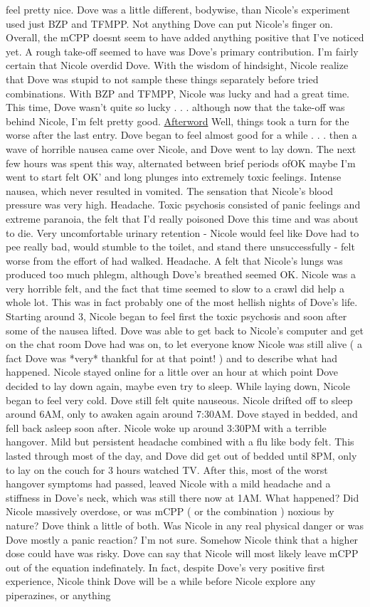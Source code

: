 \documentclass[12pt]{book}
\begin{document}
feel pretty nice. Dove was a little different, bodywise, than Nicole's experiment used just BZP and TFMPP. Not anything Dove can put Nicole's finger on. Overall, the mCPP doesnt seem to have added anything positive that I've noticed yet. A rough take-off seemed to have was Dove's primary contribution. I'm fairly certain that Nicole overdid Dove. With the wisdom of hindsight, Nicole realize that Dove was stupid to not sample these things separately before tried combinations. With BZP and TFMPP, Nicole was lucky and had a great time. This time, Dove wasn't quite so lucky . . .  although now that the take-off was behind Nicole, I'm felt pretty good. \underline{Afterword} Well, things took a turn for the worse after the last entry. Dove began to feel almost good for a while . . .  then a wave of horrible nausea came over Nicole, and Dove went to lay down. The next few hours was spent this way, alternated between brief periods ofOK maybe I'm went to start felt OK' and long plunges into extremely toxic feelings. Intense nausea, which never resulted in vomited. The sensation that Nicole's blood pressure was very high. Headache. Toxic psychosis consisted of panic feelings and extreme paranoia, the felt that I'd really poisoned Dove this time and was about to die. Very uncomfortable urinary retention - Nicole would feel like Dove had to pee really bad, would stumble to the toilet, and stand there unsuccessfully - felt worse from the effort of had walked. Headache. A felt that Nicole's lungs was produced too much phlegm, although Dove's breathed seemed OK. Nicole was a very horrible felt, and the fact that time seemed to slow to a crawl did help a whole lot. This was in fact probably one of the most hellish nights of Dove's life. Starting around 3, Nicole began to feel first the toxic psychosis and soon after some of the nausea lifted. Dove was able to get back to Nicole's computer and get on the chat room Dove had was on, to let everyone know Nicole was still alive ( a fact Dove was *very* thankful for at that point! ) and to describe what had happened. Nicole stayed online for a little over an hour at which point Dove decided to lay down again, maybe even try to sleep. While laying down, Nicole began to feel very cold. Dove still felt quite nauseous. Nicole drifted off to sleep around 6AM, only to awaken again around 7:30AM. Dove stayed in bedded, and fell back asleep soon after. Nicole woke up around 3:30PM with a terrible hangover. Mild but persistent headache combined with a flu like body felt. This lasted through most of the day, and Dove did get out of bedded until 8PM, only to lay on the couch for 3 hours watched TV. After this, most of the worst hangover symptoms had passed, leaved Nicole with a mild headache and a stiffness in Dove's neck, which was still there now at 1AM. What happened? Did Nicole massively overdose, or was mCPP ( or the combination ) noxious by nature? Dove think a little of both. Was Nicole in any real physical danger or was Dove mostly a panic reaction? I'm not sure. Somehow Nicole think that a higher dose could have was risky. Dove can say that Nicole will most likely leave mCPP out of the equation indefinately. In fact, despite Dove's very positive first experience, Nicole think Dove will be a while before Nicole explore any piperazines, or anything 
\end{document}
